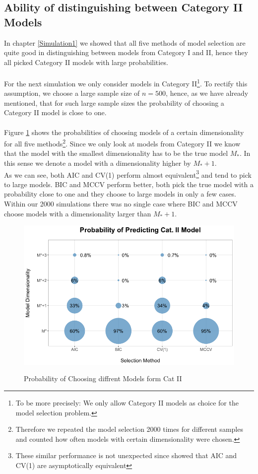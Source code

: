 \documentclass[Research_Module_ES.tex]{subfiles}
\begin{document}
\subsection{Ability of distinguishing  between Category II Models}
In chapter \ref{Simulation1} we showed that all five methods of model selection are quite good in distinguishing between models from Category I and II, hence they all picked Category II models with large probabilities. \\
\\
For the next simulation we only consider models in Category II\footnote{To be more precisely: We only allow Category II models as choice for the model selection problem.}. To rectify this assumption, we choose a large sample size of $n=500$, hence, as we have already mentioned, that for such large sample sizes the probability of choosing a Category II model is close to one.\\
\\
Figure \ref{Simulation2} shows the probabilities of choosing models of a certain dimensionality for all five methods\footnote{Therefore we repeated the model selection 2000 times for different samples and counted how often models with certain dimensionality were chosen.}. Since we only look at models from Category II we know that the model with the smallest dimensionality has to be the true model $M_\ast$.
In this sense we denote a model with a dimensionality higher by $M_\ast+1$.\\
As we can see, both AIC and CV(1) perform almost equivalent\footnote{These similar performance is not unexpected since \cite{stone1977asymptotic} showed that AIC and CV(1) are asymptotically equivalent} and tend to pick to large models. BIC and MCCV  perform better, both pick the true model with a probability close to one and they choose to large models in only a few cases. Within our 2000 simulations there was no single case where BIC and MCCV choose models with a dimensionality larger than $M_\ast+1$.
\begin{figure}[!h]
	\label{Simulation2}
	\centering
	\includegraphics[width=1\textwidth]{Simulation2.png}\\
	\caption{Probability of Choosing diffrent Models form Cat II}
\end{figure}
\end{document}
